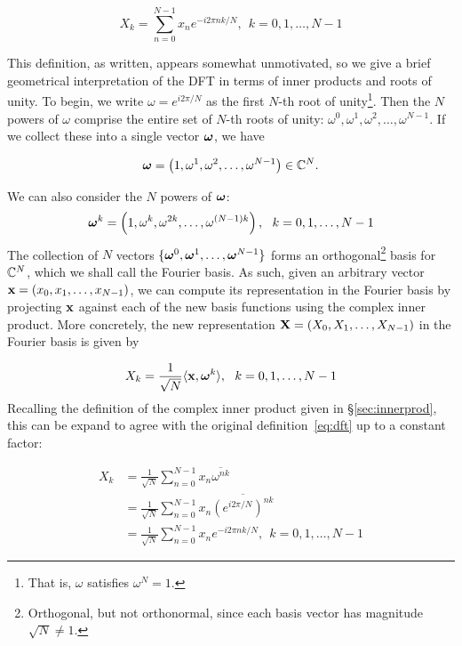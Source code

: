 \begin{equation}
	X_k = \sum_{n=0}^{N-1}x_n e^{-i2\pi n k/N}, \ \ k = 0, 1, \dots, N-1
\label{eq:dft}
\end{equation}

This definition, as written, appears somewhat unmotivated, so we give a brief geometrical interpretation of the DFT in terms of inner products and roots of unity. 
To begin, we write $\omega = e^{i2 \pi / N}$ as the first $N$-th root of unity\footnote{That is, $\omega$ satisfies $\omega^N = 1$.}. Then the $N$ powers of $\omega$ comprise the entire set of $N$-th roots of unity: $\omega^0, \omega^1, \omega^2, \dots, \omega^{N-1}$. If we collect these into a single vector $\boldsymbol{\omega}$, we have 

\begin{equation}
	\boldsymbol{\omega} = \left(1, \omega^1, \omega^2, \dots, \omega^{N-1}\right) \in \mathbb{C}^N. 
\end{equation}

We can also consider the $N$ powers of $\boldsymbol{\omega}$:
\begin{equation}
	\boldsymbol{\omega}^k = \left(1, \omega^k, \omega^{2k}, \dots, \omega^{(N-1)k}\right), \ \ k = 0, 1, \dots, N-1
\end{equation}
The collection of $N$ vectors $\{\boldsymbol{\omega}^0, \boldsymbol{\omega}^1, \dots, \boldsymbol{\omega}^{N-1}\}$ forms an orthogonal\footnote{Orthogonal, but not orthonormal, since each basis vector has magnitude $\sqrt{N} \neq 1$.} basis for $\mathbb{C}^N$, which we shall call the Fourier basis. As such, given an arbitrary vector $\mathbf{x} = \left(x_0, x_1, \dots, x_{N-1}\right)$, we can compute its representation in the Fourier basis by projecting $\mathbf{x}$ against each of the new basis functions using the complex inner product. More concretely, the new representation $\mathbf{X} = \left(X_0, X_1, \dots, X_{N-1}\right)$ in the Fourier basis is given by 

\begin{equation}
	X_k = \frac{1}{\sqrt{N}} \langle \mathbf{x}, \boldsymbol{\omega}^k \rangle, \ \ k = 0, 1, \dots, N-1
\end{equation}
Recalling the definition of the complex inner product given in \S\ref{sec:innerprod}, this can be expand to agree with the original definition~\ref{eq:dft} up to a constant factor:

\begin{align}
	X_k &= \frac{1}{\sqrt{N}}\sum_{n=0}^{N-1}x_n \overline{\omega^{nk}}\\
	        &= \frac{1}{\sqrt{N}}\sum_{n=0}^{N-1}x_n \overline{\left(e^{i 2 \pi / N}\right)^{nk}}\\
	        &= \frac{1}{\sqrt{N}}\sum_{n=0}^{N-1}x_n e^{-i2\pi n k/N}, \ \ k = 0, 1, \dots, N-1
\end{align}

